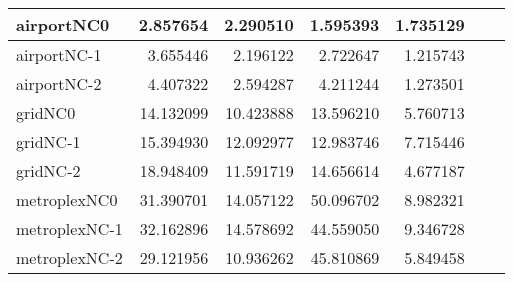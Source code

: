 \begin{longtable}{|l|r|r|r|r|r|r|}
airportNC0 & 2.857654 & 2.290510 & 1.595393 & 1.735129 \\ \hline
airportNC-1 & 3.655446 & 2.196122 & 2.722647 & 1.215743 \\ \hline
airportNC-2 & 4.407322 & 2.594287 & 4.211244 & 1.273501 \\ \hline
gridNC0 & 14.132099 & 10.423888 & 13.596210 & 5.760713 \\ \hline
gridNC-1 & 15.394930 & 12.092977 & 12.983746 & 7.715446 \\ \hline
gridNC-2 & 18.948409 & 11.591719 & 14.656614 & 4.677187 \\ \hline
metroplexNC0 & 31.390701 & 14.057122 & 50.096702 & 8.982321 \\ \hline
metroplexNC-1 & 32.162896 & 14.578692 & 44.559050 & 9.346728 \\ \hline
metroplexNC-2 & 29.121956 & 10.936262 & 45.810869 & 5.849458 \\ \hline
\end{longtable}
